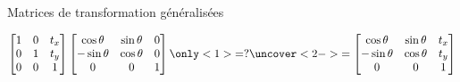 \documentclass[compress]{beamer}
\begin{document}
\begin{frame}{Matrices de transformation généralisées}

\[
\begin{bmatrix} 1 & 0 & t_x \\
                0 & 1 & t_y \\
                0 & 0 & 1
\end{bmatrix} 
\begin{bmatrix} 
            \cos \theta  & \sin\theta & 0 \\ 
           -\sin \theta & \cos \theta & 0 \\
            0 & 0 & 1
\end{bmatrix}
\only<1>{
= ?
}
\uncover<2->{
= \begin{bmatrix} 
            \cos \theta  & \sin\theta & t_x \\ 
           -\sin \theta & \cos \theta & t_y \\
            0 & 0 & 1
\end{bmatrix}
}
\]



\end{frame}
\end{document}
